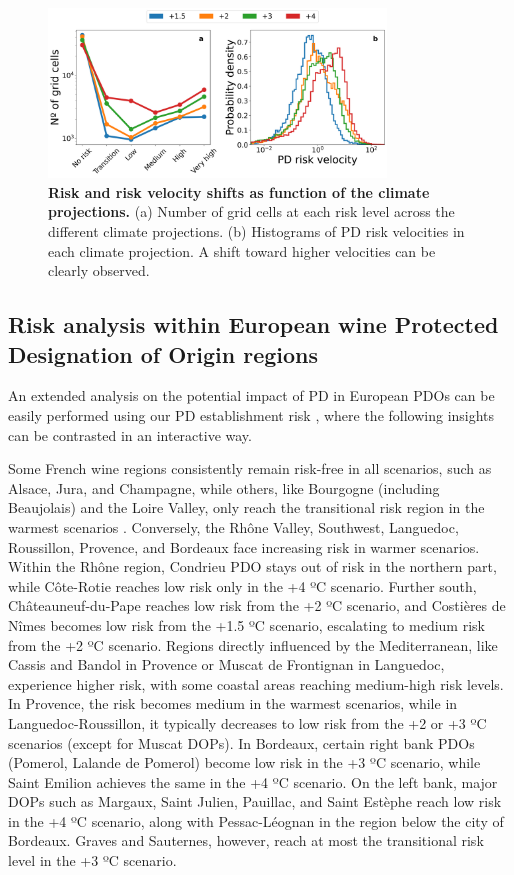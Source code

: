 \begin{figure}[H]
    \centering

    \includegraphics[width=0.8\textwidth]{Figures/Future_risk_velocity_vector_histogram.png}
    \caption{\textbf{Risk and risk velocity shifts as function of the
            climate projections.} (a) Number of grid cells at each risk level
        across the
        different climate projections. (b) Histograms of PD risk velocities in
        each
        climate projection. A shift toward higher velocities can be clearly
        observed.}
    \label{fig:PD_future_risk_velocity}
\end{figure}

\subsection{Risk analysis within European wine Protected Designation of Origin
    regions}

An extended analysis on the potential impact of PD in European PDOs can be
easily performed using our PD establishment risk \webpage, where the following
insights can be contrasted in an interactive way.

Some French wine regions consistently remain risk-free in all scenarios, such
as Alsace, Jura, and Champagne, while others, like Bourgogne (including
Beaujolais) and the Loire Valley, only reach the transitional risk region in
the warmest scenarios . Conversely, the Rhône Valley, Southwest, Languedoc,
Roussillon, Provence, and Bordeaux face increasing risk in warmer scenarios.
Within the Rhône region, Condrieu PDO stays out of risk in the northern part,
while Côte-Rotie reaches low risk only in the +4 ºC scenario. Further south,
Châteauneuf-du-Pape reaches low risk from the +2 ºC scenario, and Costières de
Nîmes becomes low risk from the +1.5 ºC scenario, escalating to medium risk
from the +2 ºC scenario. Regions directly influenced by the Mediterranean, like
Cassis and Bandol in Provence or Muscat de Frontignan in Languedoc, experience
higher risk, with some coastal areas reaching medium-high risk levels. In
Provence, the risk becomes medium in the warmest scenarios, while in
Languedoc-Roussillon, it typically decreases to low risk from the +2 or +3 ºC
scenarios (except for Muscat DOPs). In Bordeaux, certain right bank PDOs
(Pomerol, Lalande de Pomerol) become low risk in the +3 ºC scenario, while
Saint Emilion achieves the same in the +4 ºC scenario. On the left bank, major
DOPs such as Margaux, Saint Julien, Pauillac, and Saint Estèphe reach low risk
in the +4 ºC scenario, along with Pessac-Léognan in the region below the city
of Bordeaux. Graves and Sauternes, however, reach at most the transitional risk
level in the +3 ºC scenario.

